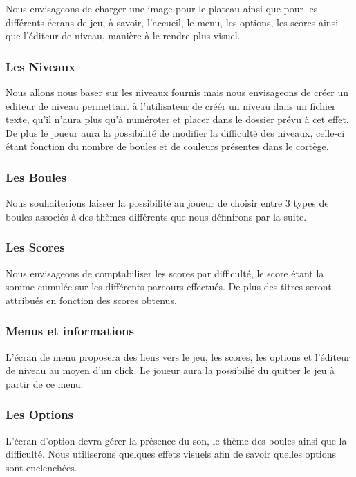 Nous envisageons de charger une image pour le plateau ainsi que pour les différents écrans de jeu, à savoir, l'accueil, le menu, les options, les scores ainsi que l'éditeur de niveau, manière à le rendre plus visuel.

\subsubsection{Les Niveaux}

Nous allons nous baser sur les niveaux fournis mais nous envisageons de créer un editeur de niveau permettant à l'utilisateur de créér un niveau dans un fichier texte, qu'il n'aura plus qu'à numéroter et placer dans le dossier prévu à cet effet.
De plus le joueur aura la possibilité de modifier la difficulté des niveaux, celle-ci étant fonction du nombre de boules et de couleurs présentes dans le cortège.

\subsubsection{Les Boules}

Nous souhaiterions laisser la possibilité au joueur de choisir entre 3 types de boules associés à des thèmes différents que nous définirons par la suite.

\subsubsection{Les Scores}

Nous envisageons de comptabiliser les scores par difficulté, le score étant la somme cumulée sur les différents parcours effectués. De plus 
des titres seront attribués en fonction des scores obtenus.

\subsubsection{Menus et informations}

L'écran de menu proposera des liens vers le jeu, les scores, les options et l'éditeur de niveau au moyen d'un click. Le joueur aura la possibilié du quitter le jeu à partir de ce menu.

\subsubsection{Les Options}

L'écran d'option devra gérer la présence du son, le thème des boules ainsi que la difficulté. Nous utiliserons quelques effets visuels afin de savoir quelles options sont enclenchées.

